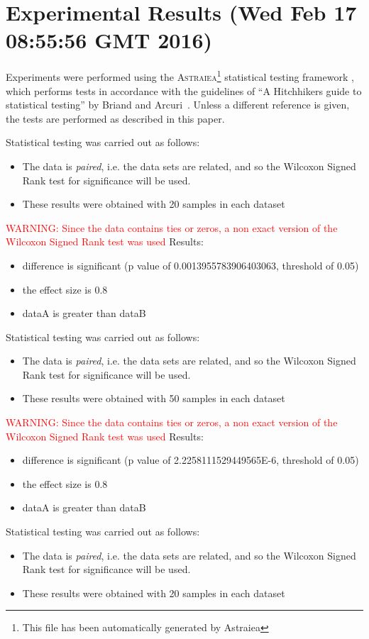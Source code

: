 \documentclass[]{article}
\begin{document}
\section{Experimental Results (Wed Feb 17 08:55:56 GMT 2016)}
Experiments were performed using the \textsc{Astraiea}\footnote{This file has been automatically generated by Astraiea} statistical testing framework \cite{Neumann:2014:EET:2598394.2609850},
which performs tests in accordance with the guidelines of ``A Hitchhikers guide to statistical testing''
by Briand and Arcuri~\cite{Arcuri2012}.
Unless a different reference is given, the tests are performed as described in this paper.

Statistical testing was carried out as follows: \begin{itemize}
\item{The data is \textit{paired}, i.e. the data sets are related, and so the Wilcoxon Signed Rank test for significance will be used.}
\item{These results were obtained with 20 samples in each dataset}
\end{itemize}
\textcolor{Red}{WARNING: Since the data contains ties or zeros, a non exact version of the Wilcoxon Signed Rank test was used
}
Results:
\begin{itemize}
\item{difference is significant (p value of 0.0013955783906403063, threshold of 0.05)}
\item{the effect size is 0.8}
\item{dataA is greater than dataB}
\end{itemize}Statistical testing was carried out as follows: \begin{itemize}
\item{The data is \textit{paired}, i.e. the data sets are related, and so the Wilcoxon Signed Rank test for significance will be used.}
\item{These results were obtained with 50 samples in each dataset}
\end{itemize}
\textcolor{Red}{WARNING: Since the data contains ties or zeros, a non exact version of the Wilcoxon Signed Rank test was used
}
Results:
\begin{itemize}
\item{difference is significant (p value of 2.2258111529449565E-6, threshold of 0.05)}
\item{the effect size is 0.8}
\item{dataA is greater than dataB}
\end{itemize}Statistical testing was carried out as follows: \begin{itemize}
\item{The data is \textit{paired}, i.e. the data sets are related, and so the Wilcoxon Signed Rank test for significance will be used.}
\item{These results were obtained with 20 samples in each dataset}
\end{itemize}
\end{document}
